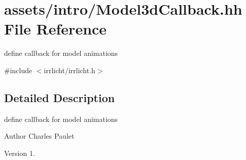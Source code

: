 \hypertarget{assets_2intro_2Model3dCallback_8hh}{}\section{assets/intro/\+Model3d\+Callback.hh File Reference}
\label{assets_2intro_2Model3dCallback_8hh}


define callback for model animations  


{\ttfamily \#include $<$irrlicht/irrlicht.\+h$>$}\newline


\subsection{Detailed Description}
define callback for model animations 

\begin{DoxyAuthor}{Author}
Charles Paulet 
\end{DoxyAuthor}
\begin{DoxyVersion}{Version}
1. 
\end{DoxyVersion}
